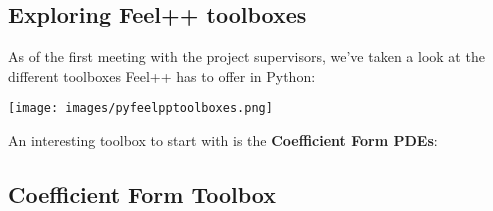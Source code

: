 \documentclass[12pt]{article}
\begin{document}
\subsection{Exploring Feel++ toolboxes}

As of the first meeting with the project supervisors, we've taken a look at the different toolboxes Feel++ has to offer in Python:
\begin{frame}{}
    \begin{center}
        \texttt{[image: images/pyfeelpptoolboxes.png]}
    \end{center}
\end{frame}

An interesting toolbox to start with is the \textbf{Coefficient Form PDEs}:

\subsection{Coefficient Form Toolbox}
\end{document}
